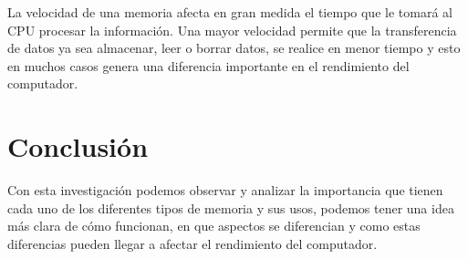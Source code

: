 \documentclass{article}
\begin{document}
La velocidad de una memoria afecta en gran medida el tiempo que le tomará al CPU procesar la información. Una mayor velocidad permite que la transferencia de datos ya sea almacenar, leer o borrar datos, se realice en menor tiempo y esto en muchos casos genera una diferencia importante en el rendimiento del computador.

\section{Conclusión}
Con esta investigación podemos observar y analizar la importancia que tienen cada uno de los diferentes tipos de memoria y sus usos, podemos tener una idea más clara de cómo funcionan, en que aspectos se diferencian y como estas diferencias pueden llegar a afectar el rendimiento del computador.

\vspace{5mm}





\nocite{*}
\end{document}
